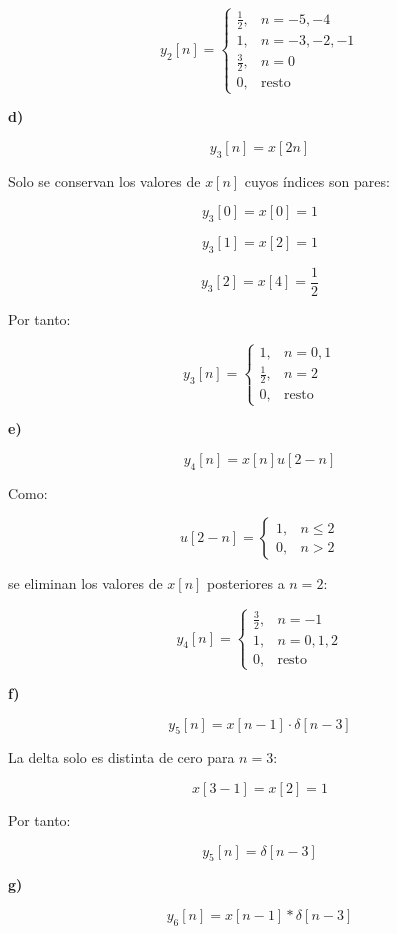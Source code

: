 \documentclass[fleqn]{article}
\begin{document}
	\[
	\boxed{
	y_2[n]=
	\begin{cases}
	\frac{1}{2}, & n=-5,-4 \\[1mm]
	1, & n=-3,-2,-1 \\[1mm]
	\frac{3}{2}, & n=0 \\[1mm]
	0, & \text{resto}
	\end{cases}
	}
	\]

	\textbf{d)}

	\[
	y_3[n]=x[2n]
	\]

	Solo se conservan los valores de $x[n]$ cuyos índices son pares:

	\[
	y_3[0]=x[0]=1
	\]

	\[
	y_3[1]=x[2]=1
	\]

	\[
	y_3[2]=x[4]=\frac{1}{2}
	\]

	Por tanto:

	\[
	\boxed{
	y_3[n]=
	\begin{cases}
	1, & n=0,1 \\[1mm]
	\frac{1}{2}, & n=2 \\[1mm]
	0, & \text{resto}
	\end{cases}
	}
	\]

	\textbf{e)}

	\[
	y_4[n]=x[n]u[2-n]
	\]

	Como:

	\[
	u[2-n]=
	\begin{cases}
	1, & n\leq2 \\[1mm]
	0, & n>2
	\end{cases}
	\]

	se eliminan los valores de $x[n]$ posteriores a $n=2$:

	\[
	\boxed{
	y_4[n]=
	\begin{cases}
	\frac{3}{2}, & n=-1 \\[1mm]
	1, & n=0,1,2 \\[1mm]
	0, & \text{resto}
	\end{cases}
	}
	\]

	\textbf{f)}

	\[
	y_5[n]
	=
	x[n-1]\cdot\delta[n-3]
	\]

	La delta solo es distinta de cero para $n=3$:

	\[
	x[3-1]
	=
	x[2]
	=
	1
	\]

	Por tanto:

	\[
	\boxed{
	y_5[n]=\delta[n-3]
	}
	\]

	\textbf{g)}

	\[
	y_6[n]
	=
	x[n-1]*\delta[n-3]
	\]
\end{document}
